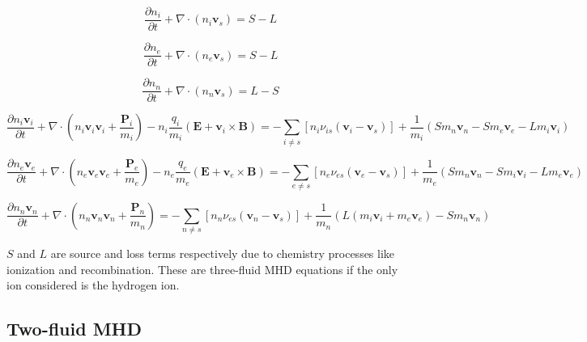 \documentclass[12pt,upcase]{umlthesis}
\begin{document}
\begin{equation}\label{eq:icontinuity}
	\frac{\partial n_i}{\partial t} + \nabla \cdot (n_i \textbf{v}_s) = S - L
\end{equation}

\begin{equation}\label{eq:econtinuity}
	\frac{\partial n_e}{\partial t} + \nabla \cdot (n_e \textbf{v}_s) = S - L
\end{equation}

\begin{equation}\label{eq:ncontinuity}
	\frac{\partial n_n}{\partial t} + \nabla \cdot (n_n \textbf{v}_s) = L - S
\end{equation}

\begin{equation}\label{eq:imomentum}
	\frac{\partial n_i \textbf{v}_i}{\partial t} + \nabla \cdot (n_i \textbf{v}_i \textbf{v}_i + \frac{\textbf{P}_i}{m_i} ) - n_i \frac{q_i}{m_i}(\textbf{E} + \textbf{v}_i \times \textbf{B}) = - \sum_{i \neq s} [n_i \nu_{is}(\textbf{v}_i - \textbf{v}_s)] + \frac{1}{m_i} (S m_n \textbf{v}_n - S m_e \textbf{v}_e -L m_i \textbf{v}_i)
\end{equation}

\begin{equation}\label{eq:emomentum}
	\frac{\partial n_e \textbf{v}_e}{\partial t} + \nabla \cdot (n_e \textbf{v}_e \textbf{v}_e + \frac{\textbf{P}_e}{m_e} ) - n_e \frac{q_e}{m_e}(\textbf{E} + \textbf{v}_e \times \textbf{B}) = - \sum_{e \neq s} [n_e \nu_{es}(\textbf{v}_e - \textbf{v}_s)] + \frac{1}{m_e} (S m_n \textbf{v}_n - S m_i \textbf{v}_i - L m_e \textbf{v}_e)
\end{equation}

\begin{equation}\label{eq:nmomentum}
	\frac{\partial n_n \textbf{v}_n}{\partial t} + \nabla \cdot (n_n \textbf{v}_n \textbf{v}_n + \frac{\textbf{P}_n}{m_n} ) = - \sum_{n \neq s} [n_n \nu_{es}(\textbf{v}_n - \textbf{v}_s)] + \frac{1}{m_n} (L(m_i\textbf{v}_i+m_e\textbf{v}_e) -S m_n \textbf{v}_n)
\end{equation}

$S$ and $L$ are source and loss terms respectively due to chemistry processes like ionization and recombination. These are three-fluid MHD equations if the only ion considered is the hydrogen ion.

\subsection{Two-fluid MHD}\label{sec:2fluidmhd}
\end{document}
